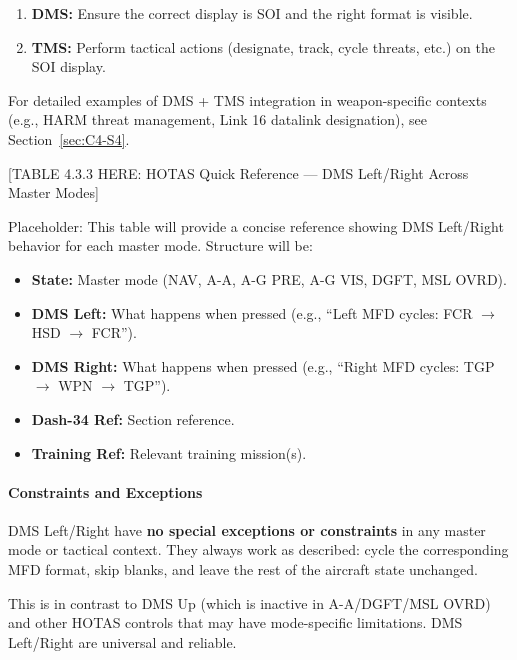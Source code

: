 \documentclass[11pt,a4paper]{article}
\begin{document}
\begin{enumerate}

\item \textbf{DMS:} Ensure the correct display is SOI and the right format is visible.

\item \textbf{TMS:} Perform tactical actions (designate, track, cycle threats, etc.) on the SOI display.

\end{enumerate}

For detailed examples of DMS + TMS integration in weapon-specific contexts (e.g., HARM threat management, Link 16 datalink designation), see Section~\ref{sec:C4-S4}.

[TABLE 4.3.3 HERE: HOTAS Quick Reference — DMS Left/Right Across Master Modes]

Placeholder: This table will provide a concise reference showing DMS Left/Right behavior for each master mode. Structure will be:

\begin{itemize}

\item \textbf{State:} Master mode (NAV, A-A, A-G PRE, A-G VIS, DGFT, MSL OVRD).

\item \textbf{DMS Left:} What happens when pressed (e.g., ``Left MFD cycles: FCR $\to$ HSD $\to$ FCR'').

\item \textbf{DMS Right:} What happens when pressed (e.g., ``Right MFD cycles: TGP $\to$ WPN $\to$ TGP'').

\item \textbf{Dash-34 Ref:} Section reference.

\item \textbf{Training Ref:} Relevant training mission(s).

\end{itemize}

\paragraph*{Constraints and Exceptions}

DMS Left/Right have \textbf{no special exceptions or constraints} in any master mode or tactical context. They always work as described: cycle the corresponding MFD format, skip blanks, and leave the rest of the aircraft state unchanged.

This is in contrast to DMS Up (which is inactive in A-A/DGFT/MSL OVRD) and other HOTAS controls that may have mode-specific limitations. DMS Left/Right are universal and reliable.
\end{document}
